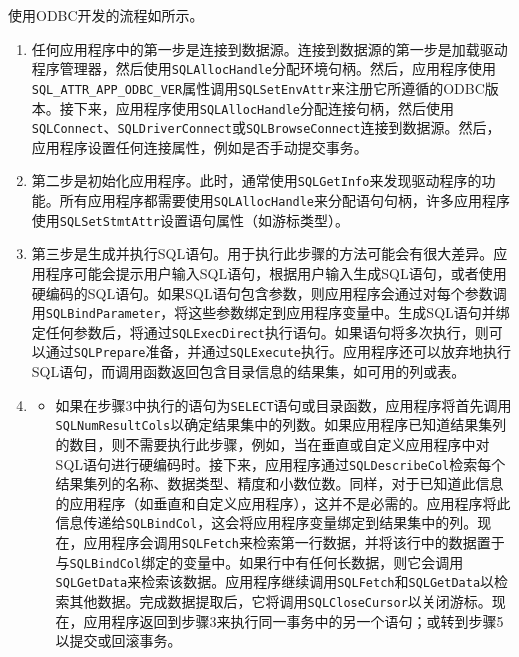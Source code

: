 \documentclass[lang=cn,11pt,a4paper,cite=authornum]{paper}
\begin{document}
使用ODBC开发的流程如所示。

\begin{enumerate}
    \item 任何应用程序中的第一步是连接到数据源。连接到数据源的第一步是加载驱动程序管理器，然后使用\texttt{SQLAllocHandle}分配环境句柄。然后，应用程序使用\texttt{SQL_ATTR_APP_ODBC_VER}属性调用\texttt{SQLSetEnvAttr}来注册它所遵循的ODBC版本。接下来，应用程序使用\texttt{SQLAllocHandle}分配连接句柄，然后使用\texttt{SQLConnect}、\texttt{SQLDriverConnect}或\texttt{SQLBrowseConnect}连接到数据源。然后，应用程序设置任何连接属性，例如是否手动提交事务。
    \item 第二步是初始化应用程序。此时，通常使用\texttt{SQLGetInfo}来发现驱动程序的功能。所有应用程序都需要使用\texttt{SQLAllocHandle}来分配语句句柄，许多应用程序使用\texttt{SQLSetStmtAttr}设置语句属性（如游标类型）。
    \item 第三步是生成并执行SQL语句。用于执行此步骤的方法可能会有很大差异。应用程序可能会提示用户输入SQL语句，根据用户输入生成SQL语句，或者使用硬编码的SQL语句。如果SQL语句包含参数，则应用程序会通过对每个参数调用\texttt{SQLBindParameter}，将这些参数绑定到应用程序变量中。生成SQL语句并绑定任何参数后，将通过\texttt{SQLExecDirect}执行语句。如果语句将多次执行，则可以通过\texttt{SQLPrepare}准备，并通过\texttt{SQLExecute}执行。应用程序还可以放弃地执行SQL语句，而调用函数返回包含目录信息的结果集，如可用的列或表。
    \item \begin{itemize}
    \item 如果在步骤3中执行的语句为\texttt{SELECT}语句或目录函数，应用程序将首先调用\texttt{SQLNumResultCols}以确定结果集中的列数。如果应用程序已知道结果集列的数目，则不需要执行此步骤，例如，当在垂直或自定义应用程序中对SQL语句进行硬编码时。接下来，应用程序通过\texttt{SQLDescribeCol}检索每个结果集列的名称、数据类型、精度和小数位数。同样，对于已知道此信息的应用程序（如垂直和自定义应用程序），这并不是必需的。应用程序将此信息传递给\texttt{SQLBindCol}，这会将应用程序变量绑定到结果集中的列。现在，应用程序会调用\texttt{SQLFetch}来检索第一行数据，并将该行中的数据置于与\texttt{SQLBindCol}绑定的变量中。如果行中有任何长数据，则它会调用\texttt{SQLGetData}来检索该数据。应用程序继续调用\texttt{SQLFetch}和\texttt{SQLGetData}以检索其他数据。完成数据提取后，它将调用\texttt{SQLCloseCursor}以关闭游标。现在，应用程序返回到步骤3来执行同一事务中的另一个语句；或转到步骤5以提交或回滚事务。

\end{itemize}
\end{enumerate}
\end{document}

